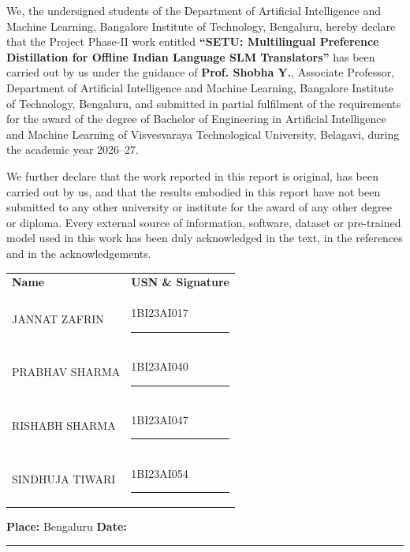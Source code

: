 \thispagestyle{frontblank}

{\fontsize{12}{20}\selectfont
\setlength{\parindent}{0.5in}

We, the undersigned students of the Department of Artificial Intelligence and
Machine Learning, Bangalore Institute of Technology, Bengaluru, hereby declare
that the Project Phase-II work entitled \textbf{``SETU:
Multilingual Preference Distillation for Offline Indian Language SLM
Translators''} has been carried out by us under the guidance of
\textbf{Prof. Shobha Y.}, Associate Professor, Department of Artificial
Intelligence and Machine Learning, Bangalore Institute of Technology, Bengaluru,
and submitted in partial fulfilment of the requirements for the award of the
degree of Bachelor of Engineering in Artificial Intelligence and Machine
Learning of Visvesvaraya Technological University, Belagavi, during the academic
year 2026--27.

We further declare that the work reported in this report is original, has been
carried out by us, and that the results embodied in this report have not been
submitted to any other university or institute for the award of any other degree
or diploma. Every external source of information, software, dataset or
pre-trained model used in this work has been duly acknowledged in the text, in
the references and in the acknowledgements.

}

\vspace{40pt}

\noindent
\begin{tabular}{@{}p{}p{}@{}}
\textbf{Name} & \textbf{USN \& Signature} \\[16pt]
JANNAT ZAFRIN    & 1BI23AI017 \hspace{6mm}\rule{0.38\textwidth}{0.4pt} \\[18pt]
PRABHAV SHARMA   & 1BI23AI040 \hspace{6mm}\rule{0.38\textwidth}{0.4pt} \\[18pt]
RISHABH SHARMA   & 1BI23AI047 \hspace{6mm}\rule{0.38\textwidth}{0.4pt} \\[18pt]
SINDHUJA TIWARI  & 1BI23AI054 \hspace{6mm}\rule{0.38\textwidth}{0.4pt} \\
\end{tabular}

\vspace{30pt}

\noindent
{\fontsize{12}{15}\selectfont \textbf{Place:} Bengaluru \hfill \textbf{Date:} \rule{1.6in}{0.4pt}}

\clearpage
